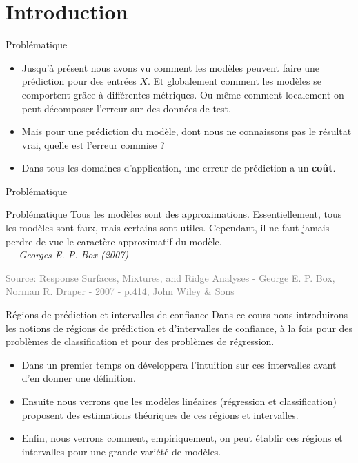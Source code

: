 \section[Introduction]{Introduction}

\begin{frame}{Problématique}
	\begin{itemize}
		\item Jusqu'à présent nous avons vu comment les modèles peuvent faire une prédiction pour des entrées $X$. Et globalement comment les modèles se comportent grâce à différentes métriques. Ou même comment localement on peut décomposer l'erreur sur des données de test. 
		\pause
		\item Mais pour une prédiction du modèle, dont nous ne connaissons pas le résultat vrai, quelle est l'erreur commise ?
		\pause
		\item Dans tous les domaines d'application, une erreur de prédiction a un \textbf{coût}.
	\end{itemize}
\end{frame}

\begin{frame}{Problématique}
	\begin{block}{Problématique}
		Tous les modèles sont des approximations. Essentiellement, tous les modèles sont faux, mais certains sont utiles. Cependant, il ne faut jamais perdre de vue le caractère approximatif du modèle. \\
		\vspace{0.5cm}
		\hfill
		\textit{--- Georges E. P. Box (2007)}
	\end{block}
	\vfill 
	\tiny \textcolor{gray}{Source: Response Surfaces, Mixtures, and Ridge Analyses - George E. P. Box, Norman R. Draper  - 2007 - p.414, John Wiley \& Sons}
\end{frame}

\begin{frame}{Régions de prédiction et intervalles de confiance}
	Dans ce cours nous introduirons les notions de régions de prédiction et d'intervalles de confiance, à la fois pour des problèmes de classification et pour des problèmes de régression.
	\begin{itemize}
		\item Dans un premier temps on développera l'intuition sur ces intervalles avant d'en donner une définition.
		\pause
		\item Ensuite nous verrons que les modèles linéaires (régression et classification) proposent des estimations théoriques de ces régions et intervalles.
		\pause
		\item Enfin, nous verrons comment, empiriquement, on peut établir ces régions et intervalles pour une grande variété de modèles.
	\end{itemize}
\end{frame}